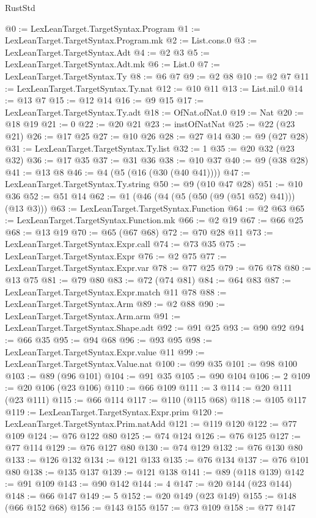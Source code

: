 \begin{lexlean}{RustStd}
\begin{coremodule}
{\begin{coremodule}
{{{{{{{{@0 := LexLeanTarget.TargetSyntax.Program
@1 := LexLeanTarget.TargetSyntax.Program.mk
@2 := List.cons.{0}
@3 := LexLeanTarget.TargetSyntax.Adt
@4 := @2 @3
@5 := LexLeanTarget.TargetSyntax.Adt.mk
@6 := List.{0}
@7 := LexLeanTarget.TargetSyntax.Ty
@8 := @6 @7
@9 := @2 @8
@10 := @2 @7
@11 := LexLeanTarget.TargetSyntax.Ty.nat
@12 := @10 @11
@13 := List.nil.{0}
@14 := @13 @7
@15 := @12 @14
@16 := @9 @15
@17 := LexLeanTarget.TargetSyntax.Ty.adt
@18 := OfNat.ofNat.{0}
@19 := Nat
@20 := @18 @19
@21 := 0
@22 := @20 @21
@23 := instOfNatNat
@25 := @22 (@23 @21)
@26 := @17 @25
@27 := @10 @26
@28 := @27 @14
@30 := @9 (@27 @28)
@31 := LexLeanTarget.TargetSyntax.Ty.list
@32 := 1
@35 := @20 @32 (@23 @32)
@36 := @17 @35
@37 := @31 @36
@38 := @10 @37
@40 := @9 (@38 @28)
@41 := @13 @8
@46 := @4 (@5 (@16 (@30 (@40 @41))))
@47 := LexLeanTarget.TargetSyntax.Ty.string
@50 := @9 (@10 @47 @28)
@51 := @10 @36
@52 := @51 @14
@62 := @1 (@46 (@4 (@5 (@50 (@9 (@51 @52) @41))) (@13 @3)))
@63 := LexLeanTarget.TargetSyntax.Function
@64 := @2 @63
@65 := LexLeanTarget.TargetSyntax.Function.mk
@66 := @2 @19
@67 := @66 @25
@68 := @13 @19
@70 := @65 (@67 @68)
@72 := @70 @28 @11
@73 := LexLeanTarget.TargetSyntax.Expr.call
@74 := @73 @35
@75 := LexLeanTarget.TargetSyntax.Expr
@76 := @2 @75
@77 := LexLeanTarget.TargetSyntax.Expr.var
@78 := @77 @25
@79 := @76 @78
@80 := @13 @75
@81 := @79 @80
@83 := @72 (@74 @81)
@84 := @64 @83
@87 := LexLeanTarget.TargetSyntax.Expr.match @11 @78
@88 := LexLeanTarget.TargetSyntax.Arm
@89 := @2 @88
@90 := LexLeanTarget.TargetSyntax.Arm.arm
@91 := LexLeanTarget.TargetSyntax.Shape.adt
@92 := @91 @25
@93 := @90 @92
@94 := @66 @35
@95 := @94 @68
@96 := @93 @95
@98 := LexLeanTarget.TargetSyntax.Expr.value @11
@99 := LexLeanTarget.TargetSyntax.Value.nat
@100 := @99 @35
@101 := @98 @100
@103 := @89 (@96 @101)
@104 := @91 @35
@105 := @90 @104
@106 := 2
@109 := @20 @106 (@23 @106)
@110 := @66 @109
@111 := 3
@114 := @20 @111 (@23 @111)
@115 := @66 @114
@117 := @110 (@115 @68)
@118 := @105 @117
@119 := LexLeanTarget.TargetSyntax.Expr.prim
@120 := LexLeanTarget.TargetSyntax.Prim.natAdd
@121 := @119 @120
@122 := @77 @109
@124 := @76 @122 @80
@125 := @74 @124
@126 := @76 @125
@127 := @77 @114
@129 := @76 @127 @80
@130 := @74 @129
@132 := @76 @130 @80
@133 := @126 @132
@134 := @121 @133
@135 := @76 @134
@137 := @76 @101 @80
@138 := @135 @137
@139 := @121 @138
@141 := @89 (@118 @139)
@142 := @91 @109
@143 := @90 @142
@144 := 4
@147 := @20 @144 (@23 @144)
@148 := @66 @147
@149 := 5
@152 := @20 @149 (@23 @149)
@155 := @148 (@66 @152 @68)
@156 := @143 @155
@157 := @73 @109
@158 := @77 @147
}}}}}}}}
\end{coremodule}}
\end{coremodule}
\end{lexlean}
